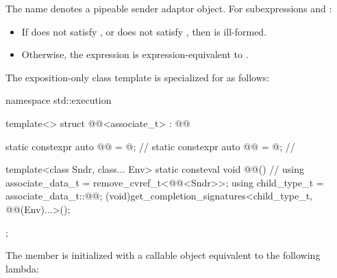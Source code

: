 \pnum
The name  denotes a pipeable sender adaptor object.
For subexpressions  and :
\begin{itemize}
\item
If  does not satisfy , or
does not satisfy , then
 is ill-formed.
\item
Otherwise,
the expression 
is expression-equivalent to
.
\end{itemize}

\pnum
The exposition-only class template 
is specialized for  as follows:
%
\begin{codeblock}
namespace std::execution {
  template<>
  struct @@<associate_t> : @@ {
    static constexpr auto @@ = @\seebelow@;                // \expos
    static constexpr auto @@ = @\seebelow@;                    // \expos

    template<class Sndr, class... Env>
      static consteval void @@() {                     // \expos
        using associate_data_t = remove_cvref_t<@@<Sndr>>;
        using child_type_t = associate_data_t::@@;
        (void)get_completion_signatures<child_type_t, @@(Env)...>();
    }
  };
}
\end{codeblock}

\pnum
The member 
is initialized with a callable object equivalent to the following lambda:

